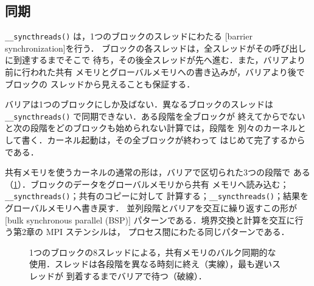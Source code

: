 \documentclass[../main.tex]{subfiles}
\begin{document}
\subsection{同期}

\begin{definition}[バリア同期]
  \texttt{\_\_syncthreads()} は，1つのブロックのスレッドにわたる
  [barrier synchronization]を行う．
  ブロックの各スレッドは，全スレッドがその呼び出しに到達するまでそこで
  待ち，その後全スレッドが先へ進む．また，バリアより前に行われた共有
  メモリとグローバルメモリへの書き込みが，バリアより後でブロックの
  スレッドから見えることも保証する．
\end{definition}

{\setlength{\emergencystretch}{2em}%
バリアは1つのブロックにしか及ばない．異なるブロックのスレッドは
\texttt{\_\_syncthreads()} で同期できない．ある段階を全ブロックが
終えてからでないと次の段階をどのブロックも始められない計算では，段階を
別々のカーネルとして書く．カーネル起動は，その全ブロックが終わって
はじめて完了するからである．\par}

\begin{definition}[バルク同期並列]
  共有メモリを使うカーネルの通常の形は，バリアで区切られた3つの段階で
  ある（\cref{fig:l03-bsp}）．ブロックのデータをグローバルメモリから共有
  メモリへ読み込む；\texttt{\_\_syncthreads()}；共有のコピーに対して
  計算する；\texttt{\_\_syncthreads()}；結果をグローバルメモリへ書き戻す．
  並列段階とバリアを交互に繰り返すこの形が
  [bulk synchronous parallel (BSP)]
  パターンである．境界交換と計算を交互に行う第2章の MPI ステンシルは，
  プロセス間にわたる同じパターンである．
\end{definition}

\begin{figure}[tb]
  \centering
  
  \caption{1つのブロックの8スレッドによる，共有メモリのバルク同期的な
    使用．スレッドは各段階を異なる時刻に終え（実線），最も遅いスレッドが
    到着するまでバリアで待つ（破線）．}
  \label{fig:l03-bsp}
\end{figure}
\end{document}
